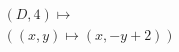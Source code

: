\documentclass[preview]{standalone}
\begin{document}
\begin{align*}
&(D,4) \mapsto \\&( (x,y) \mapsto (x, -y + 2))
\end{align*}
\end{document}
